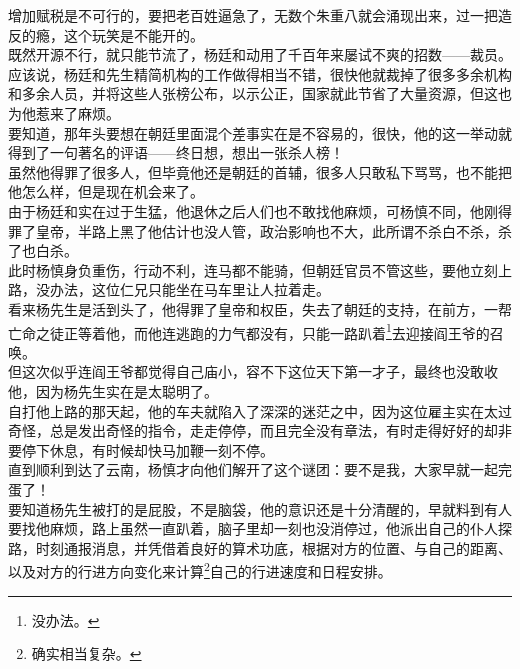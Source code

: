 \begin{multicols}{\theparacolNo}
增加赋税是不可行的，要把老百姓逼急了，无数个朱重八就会涌现出来，过一把造反的瘾，这个玩笑是不能开的。\\

既然开源不行，就只能节流了，杨廷和动用了千百年来屡试不爽的招数——裁员。\\

应该说，杨廷和先生精简机构的工作做得相当不错，很快他就裁掉了很多多余机构和多余人员，并将这些人张榜公布，以示公正，国家就此节省了大量资源，但这也为他惹来了麻烦。\\

要知道，那年头要想在朝廷里面混个差事实在是不容易的，很快，他的这一举动就得到了一句著名的评语——终日想，想出一张杀人榜！\\

虽然他得罪了很多人，但毕竟他还是朝廷的首辅，很多人只敢私下骂骂，也不能把他怎么样，但是现在机会来了。\\

由于杨廷和实在过于生猛，他退休之后人们也不敢找他麻烦，可杨慎不同，他刚得罪了皇帝，半路上黑了他估计也没人管，政治影响也不大，此所谓不杀白不杀，杀了也白杀。\\

此时杨慎身负重伤，行动不利，连马都不能骑，但朝廷官员不管这些，要他立刻上路，没办法，这位仁兄只能坐在马车里让人拉着走。\\

看来杨先生是活到头了，他得罪了皇帝和权臣，失去了朝廷的支持，在前方，一帮亡命之徒正等着他，而他连逃跑的力气都没有，只能一路趴着\footnote{没办法。}去迎接阎王爷的召唤。\\

但这次似乎连阎王爷都觉得自己庙小，容不下这位天下第一才子，最终也没敢收他，因为杨先生实在是太聪明了。\\

自打他上路的那天起，他的车夫就陷入了深深的迷茫之中，因为这位雇主实在太过奇怪，总是发出奇怪的指令，走走停停，而且完全没有章法，有时走得好好的却非要停下休息，有时候却快马加鞭一刻不停。\\

直到顺利到达了云南，杨慎才向他们解开了这个谜团：要不是我，大家早就一起完蛋了！\\

要知道杨先生被打的是屁股，不是脑袋，他的意识还是十分清醒的，早就料到有人要找他麻烦，路上虽然一直趴着，脑子里却一刻也没消停过，他派出自己的仆人探路，时刻通报消息，并凭借着良好的算术功底，根据对方的位置、与自己的距离、以及对方的行进方向变化来计算\footnote{确实相当复杂。}自己的行进速度和日程安排。\\


\end{multicols}
